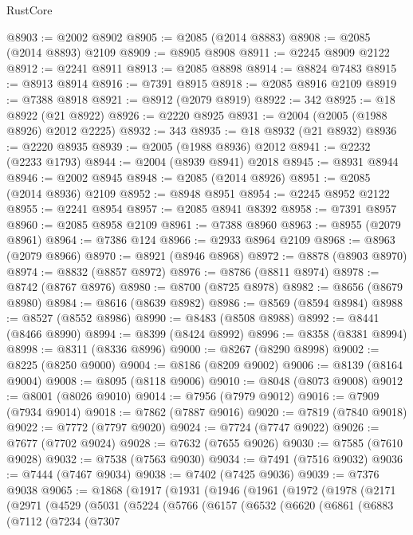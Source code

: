 \begin{lexlean}{RustCore}
\begin{coremodule}
@8903 := @2002 @8902
@8905 := @2085 (@2014 @8883)
@8908 := @2085 (@2014 @8893) @2109
@8909 := @8905 @8908
@8911 := @2245 @8909 @2122
@8912 := @2241 @8911
@8913 := @2085 @8898
@8914 := @8824 @7483
@8915 := @8913 @8914
@8916 := @7391 @8915
@8918 := @2085 @8916 @2109
@8919 := @7388 @8918
@8921 := @8912 (@2079 @8919)
@8922 := 342
@8925 := @18 @8922 (@21 @8922)
@8926 := @2220 @8925
@8931 := @2004 (@2005 (@1988 @8926) @2012 @2225)
@8932 := 343
@8935 := @18 @8932 (@21 @8932)
@8936 := @2220 @8935
@8939 := @2005 (@1988 @8936) @2012
@8941 := @2232 (@2233 @1793)
@8944 := @2004 (@8939 @8941) @2018
@8945 := @8931 @8944
@8946 := @2002 @8945
@8948 := @2085 (@2014 @8926)
@8951 := @2085 (@2014 @8936) @2109
@8952 := @8948 @8951
@8954 := @2245 @8952 @2122
@8955 := @2241 @8954
@8957 := @2085 @8941 @8392
@8958 := @7391 @8957
@8960 := @2085 @8958 @2109
@8961 := @7388 @8960
@8963 := @8955 (@2079 @8961)
@8964 := @7386 @124
@8966 := @2933 @8964 @2109
@8968 := @8963 (@2079 @8966)
@8970 := @8921 (@8946 @8968)
@8972 := @8878 (@8903 @8970)
@8974 := @8832 (@8857 @8972)
@8976 := @8786 (@8811 @8974)
@8978 := @8742 (@8767 @8976)
@8980 := @8700 (@8725 @8978)
@8982 := @8656 (@8679 @8980)
@8984 := @8616 (@8639 @8982)
@8986 := @8569 (@8594 @8984)
@8988 := @8527 (@8552 @8986)
@8990 := @8483 (@8508 @8988)
@8992 := @8441 (@8466 @8990)
@8994 := @8399 (@8424 @8992)
@8996 := @8358 (@8381 @8994)
@8998 := @8311 (@8336 @8996)
@9000 := @8267 (@8290 @8998)
@9002 := @8225 (@8250 @9000)
@9004 := @8186 (@8209 @9002)
@9006 := @8139 (@8164 @9004)
@9008 := @8095 (@8118 @9006)
@9010 := @8048 (@8073 @9008)
@9012 := @8001 (@8026 @9010)
@9014 := @7956 (@7979 @9012)
@9016 := @7909 (@7934 @9014)
@9018 := @7862 (@7887 @9016)
@9020 := @7819 (@7840 @9018)
@9022 := @7772 (@7797 @9020)
@9024 := @7724 (@7747 @9022)
@9026 := @7677 (@7702 @9024)
@9028 := @7632 (@7655 @9026)
@9030 := @7585 (@7610 @9028)
@9032 := @7538 (@7563 @9030)
@9034 := @7491 (@7516 @9032)
@9036 := @7444 (@7467 @9034)
@9038 := @7402 (@7425 @9036)
@9039 := @7376 @9038
@9065 := @1868
    (@1917
      (@1931
        (@1946
          (@1961
            (@1972
              (@1978
                (@2171
                  (@2971
                    (@4529
                      (@5031
                        (@5224
                          (@5766
                            (@6157
                              (@6532
                                (@6620
                                  (@6861
                                    (@6883
                                      (@7112
                                        (@7234
                                          (@7307

\end{coremodule}
\end{lexlean}
